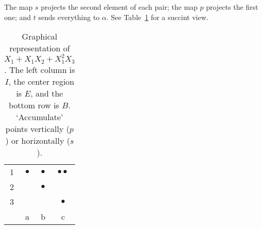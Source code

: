 The map $s$ projects the second element of each pair; the map $p$ projects the first one; and $t$ sends everything to $\alpha$. See Table~\ref{table:polyrep} for a succint view.
\begin{table}[]
\centering
\caption{Graphical representation of $X_1+X_1X_2+X_1^2X_3$. The left column is $I$, the center region is $E$, and the bottom row is $B$. `Accumulate' points vertically ($p$) or horizontally ($s$).}
\begin{tabular}{c|ccc}\label{table:polyrep}
1 & $\bullet$ & $\bullet$ & $\bullet\bullet$\\
2 &   & $\bullet$ &   \\
3 &   &   & $\bullet$ \\ \hline
  & a  & b  & c
\end{tabular}
\end{table}


\pagebreak
